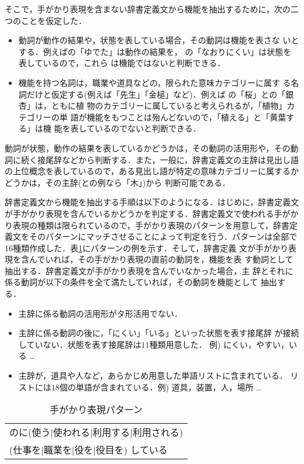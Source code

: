 \documentclass{nlp}
\begin{document}
そこで，手がかり表現を含まない辞書定義文から機能を抽出するために，次の二
つのことを仮定した．
\begin{itemize}
 \item 動詞が動作の結果や，状態を表している場合，その動詞は機能を表さな
       いとする．例えばの「ゆでた」は動作の結果を，
       の「なおりにくい」は状態を表しているので，これら
       は機能ではないと判断できる．
       
 \item 機能を持つ名詞は，職業や道具などの，限られた意味カテゴリーに属す
       る名詞だけと仮定する(例えば「先生」「金槌」など)．例えば
       の「桜」との「銀杏」は，ともに植
       物のカテゴリーに属していると考えられるが，「植物」カテゴリーの単
       語が機能をもつことは殆んどないので，「植える」と「黄葉する」は機
       能を表しているのでないと判断できる．
\end{itemize}
動詞が状態，動作の結果を表しているかどうかは，その動詞の活用形や，その動
詞に続く接尾辞などから判断する．また，一般に，辞書定義文の主辞は見出し語
の上位概念を表しているので，ある見出し語が特定の意味カテゴリーに属するか
どうかは，その主辞(との例なら「木」)から
判断可能である．

辞書定義文から機能を抽出する手順は以下のようになる．はじめに，辞書定義文
が手がかり表現を含んでいるかどうかを判定する．辞書定義文で使われる手がか
り表現の種類は限られているので，手がかり表現のパターンを用意して，辞書定
義文をそのパターンにマッチさせることによって判定を行う．パターンは全部で
16種類作成した．表\ref{table:clue}にパターンの例を示す．そして，辞書定義
文が手がかり表現を含んでいれば，その手がかり表現の直前の動詞を，機能を表
す動詞として抽出する．辞書定義文が手がかり表現を含んでいなかった場合，主
辞とそれに係る動詞が以下の条件を全て満たしていれば，その動詞を機能として
抽出する．
\begin{itemize}
 \item 主辞に係る動詞の活用形がタ形活用でない．
 \item 主辞に係る動詞の後に，「にくい」「いる」といった状態を表す接尾辞
       が接続していない．状態を表す接尾辞は$11$種類用意した．
       例) にくい，やすい，いる \dots
 \item 主辞が，道具や人など，あらかじめ用意した単語リストに含まれている．
       リストには$18$個の単語が含まれている．例) 道具，装置，人，場所 \dots
\end{itemize}

\begin{table}[h]
 \caption{手がかり表現パターン}
 \label{table:clue}
 \begin{center}
  \begin{tabular}{l}\hline
   のに(使う$|$使われる$|$利用する$|$利用される) \\ 
   (仕事を$|$職業を$|$役を$|$役目を) している \\ \hline
  \end{tabular}
 \end{center}
\end{table}
\end{document}
